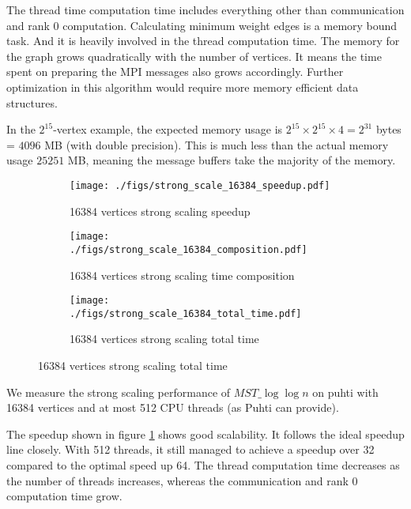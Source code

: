 \documentclass[english, 12pt, a4paper, elec, utf8, a-2b, online]{aaltothesis}
\newcommand{\mstalgo}{$MST\_\log\log{n}$}
\begin{document}
The thread time computation time includes everything other than communication and rank 0 computation. Calculating minimum weight edges is a memory bound task. And it is heavily involved in the thread computation time. The memory for the graph grows quadratically with the number of vertices. It means the time spent on preparing the MPI messages also grows accordingly. Further optimization in this algorithm would require more memory efficient data structures.

In the $2^{15}$-vertex example, the expected memory usage is $2^{15} \times 2^{15} \times 4 = 2^{31}$ bytes = $4096$ MB (with double precision). This is much less than the actual memory usage $25251$ MB, meaning the message buffers take the majority of the memory.

\begin{figure}[h]
	\begin{subfigure}[b]{0.45\textwidth}
		\centering
		\texttt{[image: ./figs/strong\_scale\_16384\_speedup.pdf]}
		\caption{16384 vertices strong scaling speedup}
		\label{fig:mpi_composition_strong_scaling_16384_speedup}
	\end{subfigure}
	\begin{subfigure}[b]{0.45\textwidth}
		\centering
		\texttt{[image: ./figs/strong\_scale\_16384\_composition.pdf]}
		\caption{16384 vertices strong scaling time composition}
		\label{fig:mpi_composition_strong_scaling_16384}
	\end{subfigure}
	\vspace{0mm} %
	\begin{subfigure}[b]{1\textwidth}
		\centering
		\texttt{[image: ./figs/strong\_scale\_16384\_total\_time.pdf]}
		\caption{16384 vertices strong scaling total time}
		\label{fig:mpi_composition_strong_scaling_16384_total}
	\end{subfigure}
	\label{fig:mpi_composition_strong_scaling_16384_}
\end{figure}

We measure the strong scaling performance of \mstalgo{} on puhti with 16384 vertices and at most 512 CPU threads (as Puhti can provide).

The speedup shown in figure \cref{fig:mpi_composition_strong_scaling_16384_speedup} shows good scalability. It follows the ideal speedup line closely. With 512 threads, it still managed to achieve a speedup over 32 compared to the optimal speed up 64. The thread computation time decreases as the number of threads increases, whereas the communication and rank 0 computation time grow.
\end{document}
